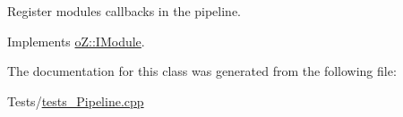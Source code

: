 Register module\textquotesingle{}s callbacks in the pipeline. 



Implements \mbox{\hyperlink{classo_z_1_1_i_module_a3dc905faa6df5e22eecc6ffbc923fd95}{o\+Z\+::\+I\+Module}}.



The documentation for this class was generated from the following file\+:\begin{DoxyCompactItemize}
\item 
Tests/\mbox{\hyperlink{tests___pipeline_8cpp}{tests\+\_\+\+Pipeline.\+cpp}}\end{DoxyCompactItemize}
